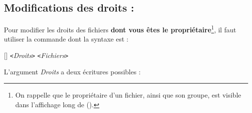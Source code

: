 \documentclass[11pt,a4paper]{article}
\begin{document}
\subsection{Modifications des droits : }
\label{droits}
Pour modifier les droits des fichiers {\bf dont vous êtes le
propriétaire}\footnote{On rappelle que le propriétaire d'un fichier,
ainsi que son groupe,
est visible dans l'affichage long de  ().}, il faut
utiliser la commande  dont la syntaxe est :

\smallskip

\hspace*{2cm}  [] \verb+<+{\em Droits}\verb+>+
\verb+<+{\em Fichiers}\verb+>+

\smallskip

L'argument {\em Droits} a deux écritures possibles :
\end{document}
